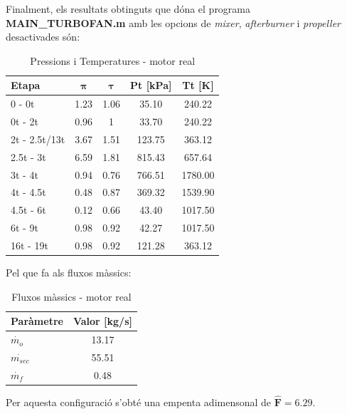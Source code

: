 Finalment, els resultats obtinguts que dóna el programa \textbf{MAIN\_TURBOFAN.m} amb les opcions de \textit{mixer}, \textit{afterburner} i \textit{propeller} desactivades són:
\begin{table}[H]
\centering
\resizebox{8cm}{!} {
\begin{tabular}{lcccc}
\toprule[3pt]
\textbf{Etapa} &\textbf{$\bm{\pi}$} & \textbf{$\bm{\tau}$}    & \textbf{Pt} [kPa]  & \textbf{Tt} [K]  \\
\midrule[1pt]
0 - 0t      & 1.23   		& 1.06  & 35.10   & 240.22             \\
0t - 2t     & 0.96   		& 1  	& 33.70   & 240.22             \\
2t - 2.5t/13t     & 3.67    & 1.51  & 123.75   & 363.12             \\
2.5t - 3t     & 6.59  		& 1.81  & 815.43  & 657.64            \\
3t - 4t     & 0.94    		& 0.76  & 766.51  & 1780.00             \\
4t - 4.5t     & 0.48        & 0.87  & 369.32  & 1539.90             \\
4.5t - 6t     & 0.12        & 0.66  & 43.40  & 1017.50             \\
6t - 9t     & 0.98          & 0.92  & 42.27  & 1017.50            \\
16t - 19t     & 0.98        & 0.92  & 121.28   & 363.12            \\
\bottomrule[2pt]
\end{tabular}
}
\caption{Pressions i Temperatures - motor real}
\end{table}
Pel que fa als fluxos màssics:
\begin{table}[H]
	\centering
	\begin{tabular}{lc}
		\toprule[3pt]
		\textbf{Paràmetre}&\textbf{Valor [kg/s]}\\
		\midrule[1pt]
		$\dot{m_{o}}$ & 13.17 \\
		$\dot{m_{sec}}$ & 55.51 \\
		$\dot{m_{f}}$ & 0.48 \\
		\bottomrule[2pt]
	\end{tabular}
	\label{C_opti2}
	\caption{Fluxos màssics - motor real}
\end{table}
Per aquesta configuració s'obté una empenta adimensonal de $\bm{\hat{F} = 6.29}$.
